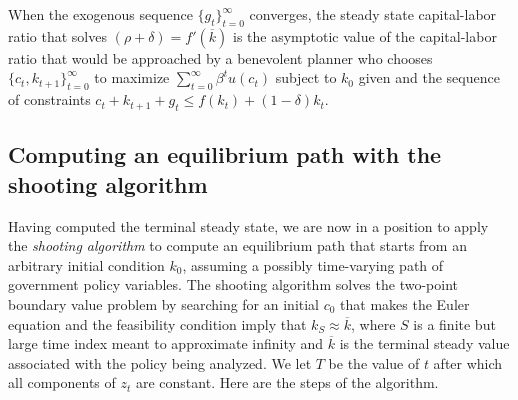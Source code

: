 When the exogenous sequence  $\{g_t\}_{t=0}^\infty$  converges, the steady state capital-labor ratio that solves $(\rho+\delta)=f'(\overline k)$ is  the
asymptotic value of the capital-labor  ratio that would be approached by
a benevolent planner who chooses $\{c_t, k_{t+1}\}_{t=0}^\infty$ to maximize $\sum_{t=0}^\infty \beta^t u(c_t) $
subject to $k_0$ given and the sequence of constraints $c_t + k_{t+1} + g_t \leq f(k_t) + (1-\delta) k_t$.

\subsection{Computing an equilibrium path with the shooting algorithm}

Having computed the terminal steady state, we are now in a
position to apply the {\it shooting algorithm\/} to compute an
equilibrium path that starts from an arbitrary initial condition
$k_0$, assuming a possibly time-varying path of government policy variables.%
%
%
%
%
%
%
%
%
%
The shooting algorithm solves the two-point
boundary value problem by  searching for an initial $c_0$ that
makes the Euler equation  and the feasibility condition
 imply that $k_S \approx \overline k$, where $S$ is a
finite but large time index meant to approximate infinity and
$\overline k$ is the terminal steady value associated with the
policy being analyzed. We let $T$ be the value of $t$ after which
all components of $z_t$ are constant.
 Here are the steps of the algorithm.
%

